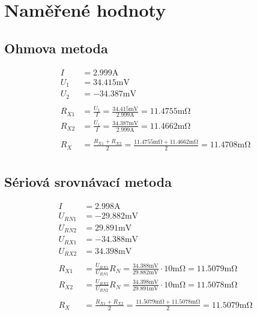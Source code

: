 \documentclass{article}
\begin{document}
\section{Naměřené hodnoty}
\subsection{Ohmova metoda}
$$
\begin{aligned}
	I &= 2.999 \si{\ampere}\\
	U_1 &= 34.415 \si{\milli\volt}\\
	U_2 &= -34.387 \si{\milli\volt}\\
	\\
	R_{X1} &= \frac{U_{1}}{I} = \frac{34.415 \si{\milli\volt}}{2.999 \si{\ampere}} = 11.4755 \si{\milli\ohm}\\
	R_{X2} &= \frac{U_{1}}{I} = \frac{34.387 \si{\milli\volt}}{2.999 \si{\ampere}} = 11.4662 \si{\milli\ohm}\\
	\\
	R_X &= \frac{R_{X1} + R_{X2}}{2} = \frac{11.4755 \si{\milli\ohm + 11.4662 \si{\milli\ohm}}}{2}=11.4708 \si{\milli\ohm}\\
\end{aligned}
$$
\subsection{Sériová srovnávací metoda}
$$
\begin{aligned}
	I &= 2.998 \si{\ampere}\\
	U_{RN1} &= -29.882 \si{\milli\volt}\\
	U_{RN2} &= 29.891 \si{\milli\volt}\\
	U_{RX1} &= -34.388 \si{\milli\volt}\\
	U_{RX2} &= 34.398 \si{\milli\volt}\\
	\\
	R_{X1}&=\frac{U_{RX1}}{U_{RN1}}R_N = \frac{34.388 \si{\milli\volt}}{29.882 \si{\milli\volt}} \cdot 10 \si{\milli\ohm} = 11.5079 \si{\milli\ohm}\\
	R_{X2}&=\frac{U_{RX2}}{U_{RN2}}R_N = \frac{34.398 \si{\milli\volt}}{29.891 \si{\milli\volt}} \cdot 10 \si{\milli\ohm} = 11.5078 \si{\milli\ohm}\\
	\\
	R_X &= \frac{R_{X1} + R_{X2}}{2} = \frac{11.5079 \si{\milli\ohm + 11.5078 \si{\milli\ohm}}}{2}=11.5079 \si{\milli\ohm}\\
\end{aligned}
$$
\end{document}
